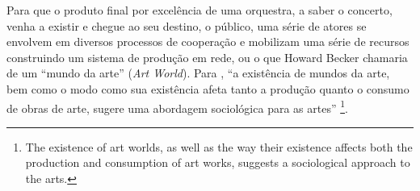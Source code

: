 \documentclass[a4paper, 12pt, openright, oneside, german, french, english, brazil]{abntex2}
\begin{document}
	Para que o produto final por excelência de uma orquestra, a saber o concerto, venha a existir e chegue ao seu destino, o público, uma série de atores se envolvem em diversos processos de cooperação e mobilizam uma série de recursos construindo um sistema de produção em rede, ou o que Howard Becker chamaria de um ``mundo da arte'' (\textit{Art World}). Para , ``a existência de mundos da arte, bem como o modo como sua existência afeta tanto a produção quanto o consumo de obras de arte, sugere uma abordagem sociológica para as artes'' \footnote{The existence of art worlds, as well as the way their existence affects both the production and consumption of art works, suggests a sociological approach to the arts.}.






\end{document}
